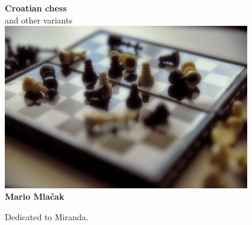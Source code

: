 \documentclass[a5paper,12pt]{book} %
\begin{document}
\setlength{\floatsep}{0.2\baselineskip} %
\setlength{\textfloatsep}{1.0\baselineskip} %
\setlength{\intextsep}{0.2\baselineskip}

\begin{titlepage}
\begin{center} %
    \hspace{2.5mm} \textbf{\huge{Croatian chess}} \\ [1.0em]
    \hspace{2.5mm} \large{and other variants} \\ [2.0cm]

    \hspace{2.5mm} \includegraphics[width=0.8\textwidth, keepaspectratio=true]{crochess.jpg} \\ [2.0cm]

    \hspace{2.5mm} \textbf{\large{Mario Mlačak}} \\ [2.0cm]
\end{center} %
\end{titlepage}

\thispagestyle{empty}
\vspace*{0.1\textheight}
\clearpage %

\thispagestyle{empty}
\vspace*{0.2\textheight}
\hfill{Dedicated to Miranda.}
\clearpage %
\end{document}

